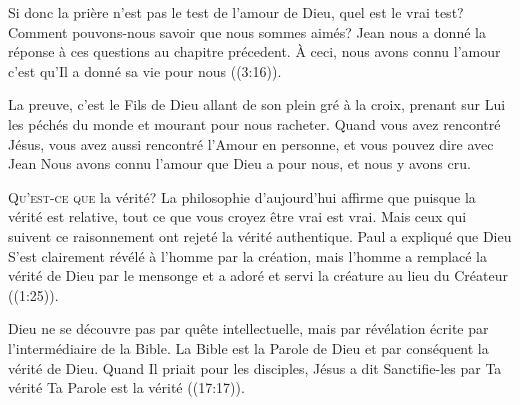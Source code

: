Si donc la prière n'est pas le test de l'amour de Dieu, quel est le vrai test?
 Comment pouvons-nous savoir que nous sommes aimés?
 Jean nous a donné la réponse à ces questions au chapitre précedent.
 \Og À ceci, nous avons connu l'amour\frcolon{}
 c'est qu'Il a donné sa vie pour nous \Fg{} ((3:16)). 


La preuve, c'est le Fils de Dieu allant de son plein gré à la croix,
 prenant sur Lui les péchés du monde et mourant pour nous racheter.
 Quand vous avez rencontré Jésus, vous avez aussi rencontré
 l'Amour en personne, et vous pouvez dire avec Jean\frcolon{} 
 \Og Nous avons connu l'amour que Dieu a pour nous, et nous y avons cru. \Fg{}

\dvrule







\lettrine{Q}{u'est-ce que} la vérité?
 La philosophie d'aujourd'hui affirme que 
 \Og puisque la vérité est relative, \Fg{} 
 tout ce que vous croyez être vrai est vrai.
 Mais ceux qui suivent ce raisonnement ont rejeté la vérité authentique.
 Paul a expliqué que Dieu S'est clairement révélé à l'homme par la création,
 mais l'homme \Og a remplacé la vérité de Dieu par le mensonge
 et a adoré et servi la créature au lieu du Créateur \Fg{}
 ((1:25)). 


Dieu ne se découvre pas par quête intellectuelle, mais par révélation écrite
 \ocadr par l'intermédiaire de la Bible.
 La Bible est la Parole de Dieu et par conséquent la vérité de Dieu.
 Quand Il priait pour les disciples, Jésus a dit\frcolon{} 
 \Og Sanctifie-les par Ta vérité\frcolon{} Ta Parole est la vérité \Fg{} 
 ((17:17)). 

